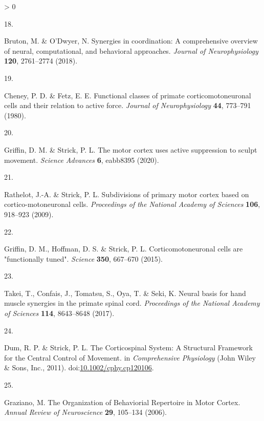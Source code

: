 \documentclass[
  a4paper,
]{article}
\newlength{\cslhangindent}
\newlength{\csllabelwidth}
\newenvironment{CSLReferences}[2] %
 {%
  \setlength{\parindent}{0pt}
  \ifodd #1 \everypar{\setlength{\hangindent}{\cslhangindent}}\ignorespaces\fi
  \ifnum #2 > 0
  \setlength{\parskip}{#2\baselineskip}
  \fi
 }%
 {}
\newcommand{\CSLLeftMargin}[1]{\parbox[t]{\csllabelwidth}{#1}}
\newcommand{\CSLRightInline}[1]{\parbox[t]{\linewidth - \csllabelwidth}{#1}\break}
\begin{document}
\begin{CSLReferences}{0}{0}
\leavevmode\hypertarget{ref-brutonSynergiesCoordinationComprehensive2018}{}%
\CSLLeftMargin{18. }
\CSLRightInline{Bruton, M. \& O'Dwyer, N. Synergies in coordination: A
comprehensive overview of neural, computational, and behavioral
approaches. \emph{Journal of Neurophysiology} \textbf{120}, 2761--2774
(2018).}

\leavevmode\hypertarget{ref-cheneyFunctionalClassesPrimate1980}{}%
\CSLLeftMargin{19. }
\CSLRightInline{Cheney, P. D. \& Fetz, E. E. Functional classes of
primate corticomotoneuronal cells and their relation to active force.
\emph{Journal of Neurophysiology} \textbf{44}, 773--791 (1980).}

\leavevmode\hypertarget{ref-griffinMotorCortexUses2020}{}%
\CSLLeftMargin{20. }
\CSLRightInline{Griffin, D. M. \& Strick, P. L. The motor cortex uses
active suppression to sculpt movement. \emph{Science Advances}
\textbf{6}, eabb8395 (2020).}

\leavevmode\hypertarget{ref-Rathelot2009}{}%
\CSLLeftMargin{21. }
\CSLRightInline{Rathelot, J.-A. \& Strick, P. L. Subdivisions of primary
motor cortex based on cortico-motoneuronal cells. \emph{Proceedings of
the National Academy of Sciences} \textbf{106}, 918--923 (2009).}

\leavevmode\hypertarget{ref-griffinCorticomotoneuronalCellsAre2015}{}%
\CSLLeftMargin{22. }
\CSLRightInline{Griffin, D. M., Hoffman, D. S. \& Strick, P. L.
Corticomotoneuronal cells are "functionally tuned". \emph{Science}
\textbf{350}, 667--670 (2015).}

\leavevmode\hypertarget{ref-Takei2017}{}%
\CSLLeftMargin{23. }
\CSLRightInline{Takei, T., Confais, J., Tomatsu, S., Oya, T. \& Seki, K.
Neural basis for hand muscle synergies in the primate spinal cord.
\emph{Proceedings of the National Academy of Sciences} \textbf{114},
8643--8648 (2017).}

\leavevmode\hypertarget{ref-dumCorticospinalSystemStructural2011}{}%
\CSLLeftMargin{24. }
\CSLRightInline{Dum, R. P. \& Strick, P. L. The {Corticospinal System}:
{A Structural Framework} for the {Central Control} of {Movement}. in
\emph{Comprehensive {Physiology}} ({John Wiley \& Sons, Inc.}, 2011).
doi:\href{https://doi.org/10.1002/cphy.cp120106}{10.1002/cphy.cp120106}.}

\leavevmode\hypertarget{ref-graziano2006}{}%
\CSLLeftMargin{25. }
\CSLRightInline{Graziano, M. The {Organization} of {Behaviorial
Repertoire} in {Motor Cortex}. \emph{Annual Review of Neuroscience}
\textbf{29}, 105--134 (2006).}


\end{CSLReferences}
\end{document}
